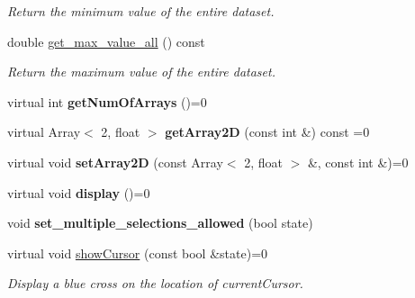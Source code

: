 \begin{DoxyCompactItemize}
\begin{DoxyCompactList}\small\item\em Return the minimum value of the entire dataset. \end{DoxyCompactList}\item 
\mbox{\label{classScreen__manager_a39bc17ac270cdea092e20bed9d3a1e65}} 
double \mbox{\hyperlink{classScreen__manager_a39bc17ac270cdea092e20bed9d3a1e65}{get\+\_\+max\+\_\+value\+\_\+all}} () const
\begin{DoxyCompactList}\small\item\em Return the maximum value of the entire dataset. \end{DoxyCompactList}\item 
\mbox{\label{classScreen__manager_a7f44a2da2dbd75df0cc6dfc415ab764b}} 
virtual int {\bfseries get\+Num\+Of\+Arrays} ()=0
\item 
\mbox{\label{classScreen__manager_a918a7406704c29efb603df2dbd230277}} 
virtual Array$<$ 2, float $>$ {\bfseries get\+Array2D} (const int \&) const =0
\item 
\mbox{\label{classScreen__manager_a48c42be07a7efc4b33e12a6364f4a8c3}} 
virtual void {\bfseries set\+Array2D} (const Array$<$ 2, float $>$ \&, const int \&)=0
\item 
\mbox{\label{classScreen__manager_a4f66218cbf4962fa8582e8185f5b2b75}} 
virtual void {\bfseries display} ()=0
\item 
\mbox{\label{classScreen__manager_ad1cd939deb35910262eaa503018ea1b6}} 
void {\bfseries set\+\_\+multiple\+\_\+selections\+\_\+allowed} (bool state)
\item 
\mbox{\label{classScreen__manager_ac67d1eb96f39a7f38fff5554e23185a3}} 
virtual void \mbox{\hyperlink{classScreen__manager_ac67d1eb96f39a7f38fff5554e23185a3}{show\+Cursor}} (const bool \&state)=0
\begin{DoxyCompactList}\small\item\em Display a blue cross on the location of current\+Cursor. \end{DoxyCompactList}\item 

\end{DoxyCompactItemize}
